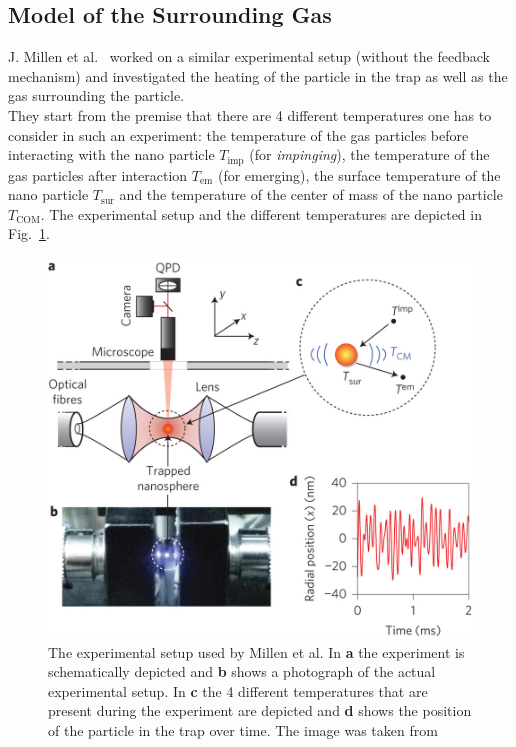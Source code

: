 \documentclass[12pt]{article}
\begin{document}
\subsection{Model of the Surrounding Gas}
J. Millen et al.~\cite{MillenJ.2014} worked on a similar experimental setup (without the feedback mechanism) and investigated the heating of the
particle in the trap as well as the gas surrounding the particle.\\
They start from the premise that there are 4 different temperatures one has to consider in such an experiment: the temperature of the gas particles
before interacting with the nano particle $T_\text{imp}$ (for \textit{impinging}), the temperature of the gas particles after 
interaction $T_\text{em}$ (for emerging), the surface temperature of the nano particle $T_\text{sur}$ and the temperature of the 
center of mass of the nano particle $T_\text{COM}$. The experimental setup
and the different temperatures are depicted in Fig.~\ref{fig:levitation}.\\
\begin{figure}[H]
    \begin{center}
        \includegraphics[scale=0.2]{images/nnano_millen.jpg}
        \caption{The experimental setup used by Millen et al. In \textbf{a} the experiment is schematically depicted and \textbf{b} shows a photograph
            of the actual experimental setup. In \textbf{c} the 4 different temperatures that are present during the experiment are depicted and
        \textbf{d} shows the position of the particle in the trap over time. The image was taken from~\cite{MillenJ.2014}}
        \label{fig:levitation}
    \end{center}
\end{figure}
\end{document}
